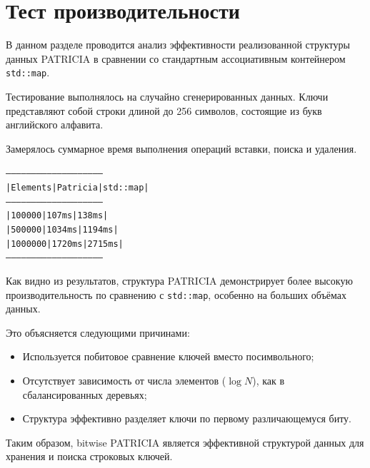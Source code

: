\section{Тест производительности}

В данном разделе проводится анализ эффективности реализованной структуры данных PATRICIA 
в сравнении со стандартным ассоциативным контейнером \texttt{std::map}.

Тестирование выполнялось на случайно сгенерированных данных. Ключи представляют собой строки 
длиной до 256 символов, состоящие из букв английского алфавита.

Замерялось суммарное время выполнения операций вставки, поиска и удаления.

\begin{alltt}
--------------------------------------------------------
| Elements   | Patricia           | std::map           |
--------------------------------------------------------
|     100000 |             107 ms |             138 ms |
|     500000 |            1034 ms |            1194 ms |
|    1000000 |            1720 ms |            2715 ms |
--------------------------------------------------------
\end{alltt}

Как видно из результатов, структура PATRICIA демонстрирует более высокую производительность 
по сравнению с \texttt{std::map}, особенно на больших объёмах данных.

Это объясняется следующими причинами:

\begin{itemize}
    \item Используется побитовое сравнение ключей вместо посимвольного;
    
    \item Отсутствует зависимость от числа элементов ($\log N$), как в сбалансированных деревьях;
    
    \item Структура эффективно разделяет ключи по первому различающемуся биту.
\end{itemize}

Таким образом, bitwise PATRICIA является эффективной структурой данных для хранения 
и поиска строковых ключей.